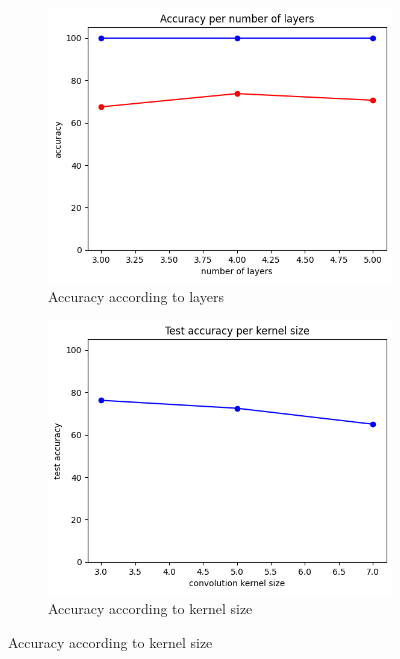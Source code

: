 \begin{figure}[htbp]
	\centering
	\begin{subfigure}[t]{0.3\linewidth}
		\centering
		\includegraphics[width=\linewidth]{image/q4-2-layers.png}
		\caption{Accuracy according to layers}
		\label{fig:q4-2-layers}
	\end{subfigure}	
    \hfill
	\begin{subfigure}[t]{0.3\linewidth}
		\centering
		\includegraphics[width=\linewidth]{image/q4-2-kernel.png}
		\caption{Accuracy according to kernel size}
		\label{fig:q4-2-kernel}
	\end{subfigure}%

\end{figure}
